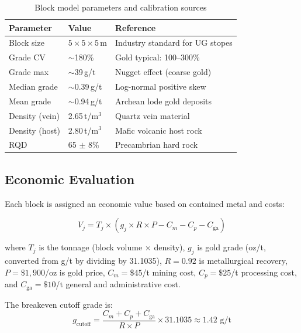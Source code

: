 \documentclass[12pt,a4paper]{article}
\begin{document}
\begin{table}[H]
\centering
\caption{Block model parameters and calibration sources}
\begin{tabular}{@{}lll@{}}
\toprule
\textbf{Parameter} & \textbf{Value} & \textbf{Reference} \\
\midrule
Block size & $5 \times 5 \times 5$\,m & Industry standard for UG stopes \\
Grade CV & $\sim$180\% & Gold typical: 100--300\% \\
Grade max & $\sim$39\,g/t & Nugget effect (coarse gold) \\
Median grade & $\sim$0.39\,g/t & Log-normal positive skew \\
Mean grade & $\sim$0.94\,g/t & Archean lode gold deposits \\
Density (vein) & 2.65\,t/m$^3$ & Quartz vein material \\
Density (host) & 2.80\,t/m$^3$ & Mafic volcanic host rock \\
RQD & 65 $\pm$ 8\% & Precambrian hard rock \\
\bottomrule
\end{tabular}
\label{tab:calibration}
\end{table}

\subsection{Economic Evaluation}
\label{sec:economics}

Each block is assigned an economic value based on contained metal and costs:

\begin{equation}
    V_j = T_j \times \left( g_j \times R \times P - C_m - C_p - C_{\text{ga}} \right)
    \label{eq:block-value}
\end{equation}

where $T_j$ is the tonnage (block volume $\times$ density), $g_j$ is gold grade (oz/t, converted from g/t by dividing by 31.1035), $R = 0.92$ is metallurgical recovery, $P = \$1{,}900$/oz is gold price, $C_m = \$45$/t mining cost, $C_p = \$25$/t processing cost, and $C_{\text{ga}} = \$10$/t general and administrative cost.

The breakeven cutoff grade is:
\begin{equation}
    g_{\text{cutoff}} = \frac{C_m + C_p + C_{\text{ga}}}{R \times P} \times 31.1035 \approx 1.42 \text{ g/t}
\end{equation}
\end{document}
